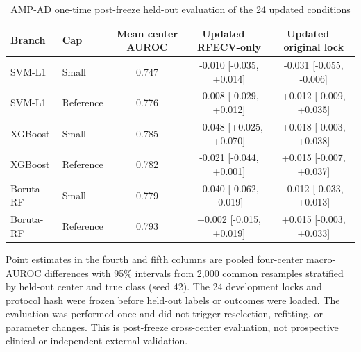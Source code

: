 \begin{table}[H]
\centering
\caption{AMP-AD one-time post-freeze held-out evaluation of the 24 updated conditions}
\label{tab:supp11}
\scriptsize
\begin{tabular}{llccc}
\toprule
Branch & Cap & Mean center AUROC & Updated $-$ RFECV-only & Updated $-$ original lock \\
\midrule
SVM-L1 & Small & 0.747 & -0.010 [-0.035, +0.014] & -0.031 [-0.055, -0.006] \\
SVM-L1 & Reference & 0.776 & -0.008 [-0.029, +0.012] & +0.012 [-0.009, +0.035] \\
XGBoost & Small & 0.785 & +0.048 [+0.025, +0.070] & +0.018 [-0.003, +0.038] \\
XGBoost & Reference & 0.782 & -0.021 [-0.044, +0.001] & +0.015 [-0.007, +0.037] \\
Boruta-RF & Small & 0.779 & -0.040 [-0.062, -0.019] & -0.012 [-0.033, +0.013] \\
Boruta-RF & Reference & 0.793 & +0.002 [-0.015, +0.019] & +0.015 [-0.003, +0.033] \\
\bottomrule
\end{tabular}
\begin{minipage}{0.98\linewidth}\scriptsize\vspace{0.3em}
Point estimates in the fourth and fifth columns are pooled four-center macro-AUROC differences with 95\% intervals from 2,000 common resamples stratified by held-out center and true class (seed 42). The 24 development locks and protocol hash were frozen before held-out labels or outcomes were loaded. The evaluation was performed once and did not trigger reselection, refitting, or parameter changes. This is post-freeze cross-center evaluation, not prospective clinical or independent external validation.
\end{minipage}
\end{table}

